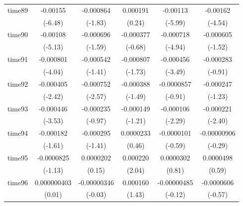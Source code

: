 \begin{table}[htbp]
\begin{tabular}{l*{5}{c}}
time89      &    -0.00155\sym{***}&   -0.000864         &    0.000191         &    -0.00113\sym{***}&    -0.00162\sym{***}\\
            &     (-6.48)         &     (-1.83)         &      (0.24)         &     (-5.99)         &     (-4.54)         \\
time90      &    -0.00108\sym{***}&   -0.000696         &   -0.000377         &   -0.000718\sym{***}&   -0.000605         \\
            &     (-5.13)         &     (-1.59)         &     (-0.68)         &     (-4.94)         &     (-1.52)         \\
time91      &   -0.000801\sym{***}&   -0.000542         &   -0.000807         &   -0.000456\sym{***}&   -0.000283         \\
            &     (-4.04)         &     (-1.41)         &     (-1.73)         &     (-3.49)         &     (-0.91)         \\
time92      &   -0.000405\sym{*}  &   -0.000752\sym{*}  &   -0.000388         &  -0.0000857         &   -0.000247         \\
            &     (-2.42)         &     (-2.57)         &     (-1.49)         &     (-0.91)         &     (-1.23)         \\
time93      &   -0.000446\sym{***}&   -0.000235         &   -0.000149         &   -0.000106\sym{*}  &   -0.000221\sym{*}  \\
            &     (-3.53)         &     (-0.97)         &     (-1.21)         &     (-2.29)         &     (-2.40)         \\
time94      &   -0.000182         &   -0.000295         &   0.0000233         &  -0.0000101         & -0.00000906         \\
            &     (-1.61)         &     (-1.41)         &      (0.46)         &     (-0.59)         &     (-0.29)         \\
time95      &  -0.0000825         &   0.0000202         &    0.000220\sym{*}  &   0.0000302         &   0.0000498         \\
            &     (-1.13)         &      (0.15)         &      (2.04)         &      (0.81)         &      (0.59)         \\
time96      & 0.000000403         & -0.00000346         &    0.000160         & -0.00000485         &  -0.0000606         \\
            &      (0.01)         &     (-0.03)         &      (1.43)         &     (-0.12)         &     (-0.57)         \\

\end{tabular}
\end{table}
